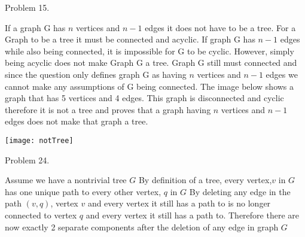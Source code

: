 \documentclass[12pt]{article}
\begin{document}
{

Problem 15.

If a graph G has $n$ vertices and $n-1$ edges it does not have to be a tree.  For a Graph to be a tree it must be connected and acyclic.  If graph G has $n-1$ edges while also being connected, it is impossible for G to be cyclic.  However, simply being acyclic does not make Graph G a tree.  Graph G still must connected and since the question only defines graph G as having $n$ vertices and $n-1$ edges we cannot make any assumptions of G being connected. The image below shows a graph that has 5 vertices and 4 edges.  This graph is disconnected and cyclic therefore it is not a tree and proves that a graph having $n$ vertices and $n-1$ edges does not make that graph a tree.

\texttt{[image: notTree]}

}

{
Problem 24.

Assume we have a nontrivial tree $G$
By definition of a tree, every vertex,$v$ in $G$ has one unique path to every other vertex, $q$ in $G$
By deleting any edge in the path $(v,q)$, vertex $v$ and every vertex it still has a path to is no longer connected to vertex $q$ and every vertex it still has a path to.
Therefore there are now exactly 2 separate components after the deletion of any edge in graph $G$

}
\end{document}
